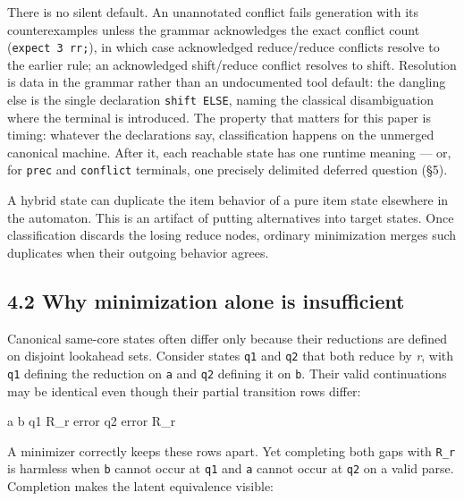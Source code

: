 \documentclass[
  10pt,
]{article}
\newenvironment{Shaded}{}{}
\newcommand{\NormalTok}[1]{#1}
\begin{document}
There is no silent default. An unannotated conflict fails generation
with its counterexamples unless the grammar acknowledges the exact
conflict count (\texttt{expect\ 3\ rr;}), in which case acknowledged
reduce/reduce conflicts resolve to the earlier rule; an acknowledged
shift/reduce conflict resolves to shift. Resolution is data in the
grammar rather than an undocumented tool default: the dangling else is
the single declaration \texttt{shift\ ELSE}, naming the classical
disambiguation where the terminal is introduced. The property that
matters for this paper is timing: whatever the declarations say,
classification happens on the unmerged canonical machine. After it, each
reachable state has one runtime meaning --- or, for \texttt{prec} and
\texttt{conflict} terminals, one precisely delimited deferred question
(§5).

A hybrid state can duplicate the item behavior of a pure item state
elsewhere in the automaton. This is an artifact of putting alternatives
into target states. Once classification discards the losing reduce
nodes, ordinary minimization merges such duplicates when their outgoing
behavior agrees.

\hypertarget{42-why-minimization-alone-is-insufficient}{%
\subsection{4.2 Why minimization alone is
insufficient}\label{42-why-minimization-alone-is-insufficient}}

Canonical same-core states often differ only because their reductions
are defined on disjoint lookahead sets. Consider states \texttt{q1} and
\texttt{q2} that both reduce by \emph{r}, with \texttt{q1} defining the
reduction on \texttt{a} and \texttt{q2} defining it on \texttt{b}. Their
valid continuations may be identical even though their partial
transition rows differ:

\begin{Shaded}
\begin{Highlighting}[]
\NormalTok{       a       b}
\NormalTok{q1    R\_r     error}
\NormalTok{q2    error   R\_r}
\end{Highlighting}
\end{Shaded}

A minimizer correctly keeps these rows apart. Yet completing both gaps
with \texttt{R\_r} is harmless when \texttt{b} cannot occur at
\texttt{q1} and \texttt{a} cannot occur at \texttt{q2} on a valid parse.
Completion makes the latent equivalence visible:
\end{document}
